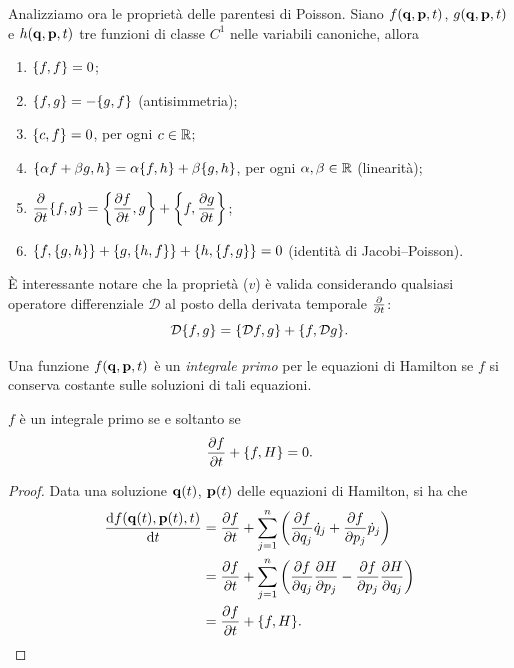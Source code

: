 Analizziamo ora le proprietà delle parentesi di Poisson. Siano $f(\vb{q}, \vb{p}, t)$, $g(\vb{q}, \vb{p}, t)$ e $h(\vb{q}, \vb{p}, t)$ tre funzioni di classe $C^1$ nelle variabili canoniche, allora
\begin{enumerate}[label=($\roman*$)]
    \item $\pb{f}{f} = 0$;
    \item $\pb{f}{g} = - \pb{g}{f}$ (antisimmetria);
    \item $\pb{c}{f} = 0$, per ogni $c\in\mathbb{R}$;
    \item $\pb{\alpha f + \beta g}{h} = \alpha \pb{f}{h} + \beta \pb{g}{h}$, per ogni $\alpha, \beta\in \mathbb{R}$  (linearità);
    \item $\displaystyle \pdv{t} \pb{f}{g} = \pb{\pdv{f}{t}}{g} + \pb{f}{\pdv{g}{t}}$;
    \item $\pb{f}{\pb{g}{h}} + \pb{g}{\pb{h}{f}} + \pb{h}{\pb{f}{g}} = 0$ (identità di Jacobi--Poisson).
\end{enumerate}

\vspace{1em}
È interessante notare che la proprietà ($v$) è valida considerando qualsiasi operatore differenziale $\mathcal{D}$ al posto della derivata temporale $\pdv{t}$:
\begin{equation*}
    \mathcal{D} \pb{f}{g} = \pb{\mathcal{D} f}{g} + \pb{f}{\mathcal{D} g}.
\end{equation*}

\begin{definition}
    Una funzione $f(\vb{q}, \vb{p}, t)$ è un \emph{integrale primo} per le equazioni di Hamilton se $f$ si conserva costante sulle soluzioni di tali equazioni.
\end{definition}
\begin{proposition}
    $f$ è un integrale primo se e soltanto se 
    \begin{equation}\label{eq:integrale_primo_poisson}
        \pdv{f}{t} + \pb{f}{H} = 0.
    \end{equation}
\end{proposition}
\begin{proof}
    Data una soluzione $\vb{q}(t)$, $\vb{p}(t)$ delle equazioni di Hamilton, si ha che
    \begin{align*}
        \dv{f(\vq(t), \vp(t), t)}{t} &= \pdv{f}{t} + \sum_{j=1}^n \left( \pdv{f}{q_j} \dot{q}_j + \pdv{f}{p_j} \dot{p}_j \right) \\
        &= \pdv{f}{t} + \sum_{j=1}^n \left(\pdv{f}{q_j} \pdv{H}{p_j} - \pdv{f}{p_j} \pdv{H}{q_j} \right) \\
        &= \pdv{f}{t} + \pb{f}{H}.
    \end{align*}
\end{proof}

